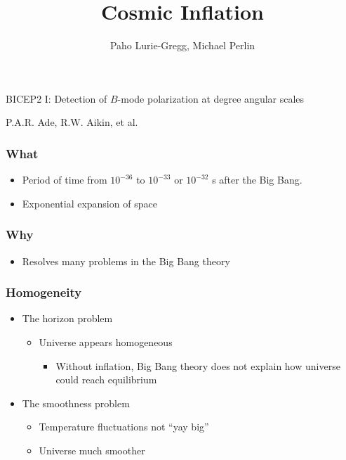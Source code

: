 \documentclass[]{beamer}
\title{Cosmic Inflation}
\author{Paho Lurie-Gregg, Michael Perlin}
\date{}
\begin{document}
\begin{frame}
  \maketitle
  \begin{center}
    BICEP2 I: Detection of $B$-mode polarization at degree angular scales

    P.A.R. Ade, R.W. Aikin, et al.
    \vspace{1.5in}
  \end{center}

\end{frame}


\begin{frame}
  \frametitle{What}
  \begin{itemize}
  \item Period of time from $10^{-36}$ to $10^{-33}$ or $10^{-32}$ s after the
    Big Bang.
  \item Exponential expansion of space
  \end{itemize}
\end{frame}

\begin{frame}
  \frametitle{Why}
  \begin{itemize}
  \item Resolves many problems in the Big Bang theory
  \end{itemize}
\end{frame}

\begin{frame}
  \frametitle{Homogeneity}
  \begin{itemize}
  \item The horizon problem
    \begin{itemize}
    \item Universe appears homogeneous
      \begin{itemize}
      \item Without inflation, Big Bang theory does not explain how universe
        could reach equilibrium
      \end{itemize}

    \end{itemize}

  \item The smoothness problem
    \begin{itemize}
    \item Temperature fluctuations not ``yay big''
    \item Universe much smoother
    \end{itemize}

  \end{itemize}

\end{frame}
\end{document}
